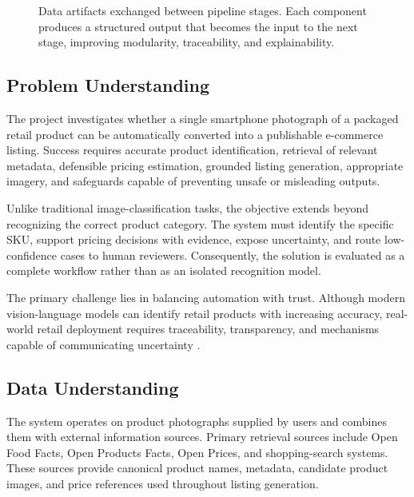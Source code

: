 \documentclass[conference]{IEEEtran}
\begin{document}
\begin{figure}[t]

\caption{
Data artifacts exchanged between pipeline stages.
Each component produces a structured output
that becomes the input to the next stage,
improving modularity, traceability, and explainability.
}
\label{fig:dataflow}

\end{figure}
\subsection{Problem Understanding}

The project investigates whether a single smartphone photograph of a
packaged retail product can be automatically converted into a
publishable e-commerce listing. Success requires accurate product
identification, retrieval of relevant metadata, defensible pricing
estimation, grounded listing generation, appropriate imagery,
and safeguards capable of preventing unsafe or misleading outputs.

Unlike traditional image-classification tasks, the objective extends
beyond recognizing the correct product category. The system must
identify the specific SKU, support pricing decisions with evidence,
expose uncertainty, and route low-confidence cases to human reviewers.
Consequently, the solution is evaluated as a complete workflow rather
than as an isolated recognition model.

The primary challenge lies in balancing automation with trust.
Although modern vision-language models can identify retail products
with increasing accuracy, real-world retail deployment requires
traceability, transparency, and mechanisms capable of communicating
uncertainty \cite{peng2020rp2k,geng2018capg}.

\subsection{Data Understanding}

The system operates on product photographs supplied by users and
combines them with external information sources. Primary retrieval
sources include Open Food Facts, Open Products Facts, Open Prices,
and shopping-search systems. These sources provide canonical product
names, metadata, candidate product images, and price references used
throughout listing generation.
\end{document}
